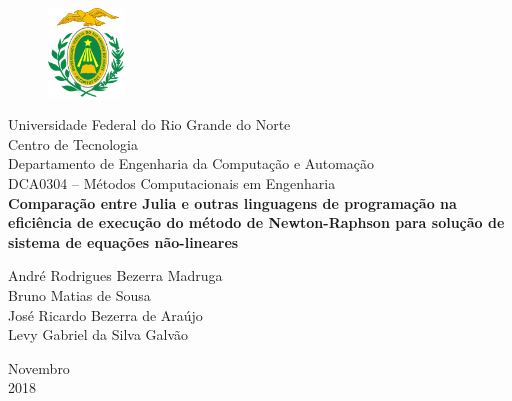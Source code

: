 \documentclass[a4paper, 12pt, openright, oneside]{article}
\begin{document}
\onehalfspacing
\begin{titlepage}
	\begin{center}
	
	\begin{figure}[!ht]
	\centering
	\includegraphics[width=2cm]{./ufrn.jpg}
	\end{figure}
		Universidade Federal do Rio Grande do Norte\\
		Centro de Tecnologia\\
		Departamento de Engenharia da Computação e Automação\\
		DCA0304 -- Métodos Computacionais em Engenharia\\
		\vspace{15pt}
        \vspace{95pt}
        \textbf{\large{Comparação entre Julia e outras linguagens de programação na eficiência de execução do método de Newton-Raphson para solução de sistema de equações não-lineares}}\\
		\vspace{3,5cm}
	\end{center}
	
	\begin{flushright}
			\item André Rodrigues Bezerra Madruga \\
			Bruno Matias de Sousa \\
			José Ricardo Bezerra de Araújo \\
			Levy Gabriel da Silva Galvão \\
 	\end{flushright}
	\vspace{1cm}
	
	\begin{center}
		\vspace{\fill}
		Novembro\\2018
	\end{center}
\end{titlepage}

\end{document}
